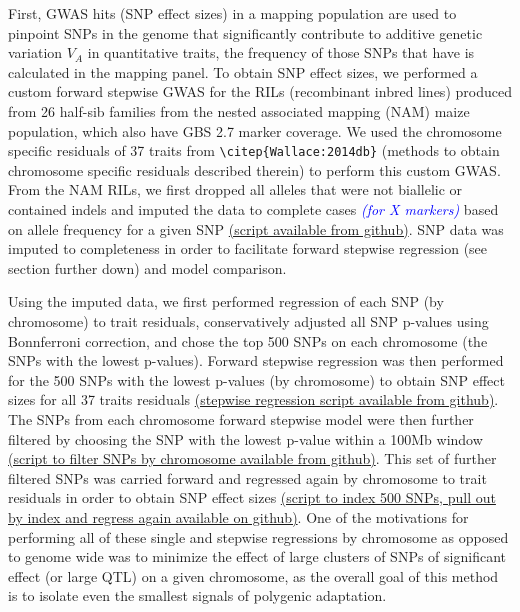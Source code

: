 \documentclass[9pt,twocolumn,twoside]{gsajnl}
\newcommand{\kc}[1]{\textcolor{blue}{ \emph{ #1}} }
\begin{document}
First, GWAS hits (SNP effect sizes) in a mapping population are used to pinpoint SNPs in the genome that significantly contribute to additive genetic variation $V_A$ in quantitative traits, the frequency of those SNPs that have is calculated in the mapping panel. 
To obtain SNP effect sizes, we performed a custom forward stepwise GWAS for the RILs (recombinant inbred lines) produced from 26 half-sib families from the nested associated mapping (NAM) maize population, which also have GBS 2.7 marker coverage.
We used the chromosome specific residuals of 37 traits from \verb|\citep{Wallace:2014db}| (methods to obtain chromosome specific residuals described therein) to perform this custom GWAS. 
From the NAM RILs, we first dropped all alleles that were not biallelic or contained indels and imputed the data to complete cases \kc{(for X markers)} based on allele frequency for a given SNP \href{https://github.com/RILAB/historical_genomics/blob/master/scripts/bulk_imputation_script1.R}{(script available from github)}. 
SNP data was imputed to completeness in order to facilitate forward stepwise regression (see section further down) and model comparison.  

Using the imputed data, we first performed regression of each SNP (by chromosome) to trait residuals, conservatively adjusted all SNP p-values using Bonnferroni correction, and chose the top 500 SNPs on each chromosome (the SNPs with the lowest p-values). 
Forward stepwise regression was then performed for the 500 SNPs with the lowest p-values (by chromosome) to obtain SNP effect sizes for all 37 traits residuals \href{https://github.com/RILAB/historical_genomics/blob/master/scripts/single_step_NAM_script_2.R}{(stepwise regression script available from github)}. 
The SNPs from each chromosome forward stepwise model were then further filtered by choosing the SNP with the lowest p-value within a 100Mb window \href{https://github.com/RILAB/historical_genomics/blob/master/scripts/filter_snp_effects_script_3.R}{(script to filter SNPs by chromosome available from github)}. 
This set of further filtered SNPs was carried forward and regressed again by chromosome to trait residuals in order to obtain SNP effect sizes \href{https://github.com/RILAB/historical_genomics/blob/master/scripts/final_effects_script_4.R}{(script to index 500 SNPs, pull out by index and regress again available on github)}.
One of the motivations for performing all of these single and stepwise regressions by chromosome as opposed to genome wide was to minimize the effect of large clusters of SNPs of significant effect (or large QTL) on a given chromosome, as the overall goal of this method is to isolate even the smallest signals of polygenic adaptation.
\end{document}
